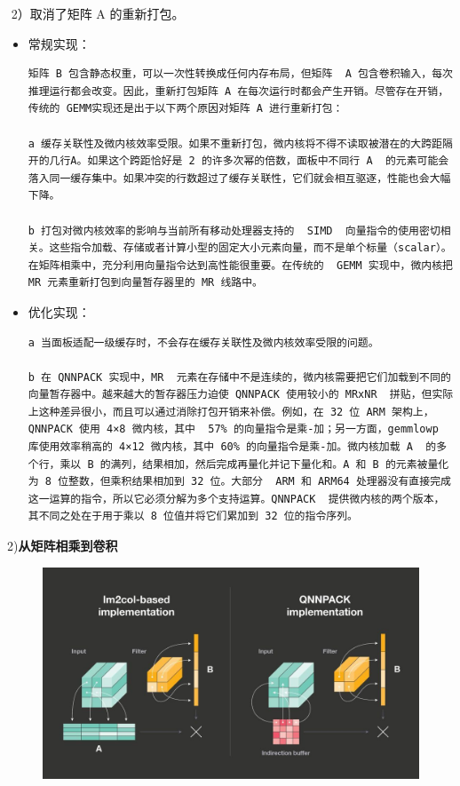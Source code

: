 ​ 2）取消了矩阵 A 的重新打包。

\begin{itemize}
\item
  常规实现：

\begin{verbatim}
矩阵 B 包含静态权重，可以一次性转换成任何内存布局，但矩阵  A 包含卷积输入，每次推理运行都会改变。因此，重新打包矩阵 A 在每次运行时都会产生开销。尽管存在开销，传统的 GEMM实现还是出于以下两个原因对矩阵 A 进行重新打包：

a 缓存关联性及微内核效率受限。如果不重新打包，微内核将不得不读取被潜在的大跨距隔开的几行A。如果这个跨距恰好是 2 的许多次幂的倍数，面板中不同行 A  的元素可能会落入同一缓存集中。如果冲突的行数超过了缓存关联性，它们就会相互驱逐，性能也会大幅下降。

b 打包对微内核效率的影响与当前所有移动处理器支持的  SIMD  向量指令的使用密切相关。这些指令加载、存储或者计算小型的固定大小元素向量，而不是单个标量（scalar）。在矩阵相乘中，充分利用向量指令达到高性能很重要。在传统的  GEMM 实现中，微内核把 MR 元素重新打包到向量暂存器里的 MR 线路中。
\end{verbatim}
\item
  优化实现：

\begin{verbatim}
a 当面板适配一级缓存时，不会存在缓存关联性及微内核效率受限的问题。

b 在 QNNPACK 实现中，MR  元素在存储中不是连续的，微内核需要把它们加载到不同的向量暂存器中。越来越大的暂存器压力迫使 QNNPACK 使用较小的 MRxNR  拼贴，但实际上这种差异很小，而且可以通过消除打包开销来补偿。例如，在 32 位 ARM 架构上，QNNPACK 使用 4×8 微内核，其中  57% 的向量指令是乘-加；另一方面，gemmlowp 库使用效率稍高的 4×12 微内核，其中 60% 的向量指令是乘-加。微内核加载 A  的多个行，乘以 B 的满列，结果相加，然后完成再量化并记下量化和。A 和 B 的元素被量化为 8 位整数，但乘积结果相加到 32 位。大部分  ARM 和 ARM64 处理器没有直接完成这一运算的指令，所以它必须分解为多个支持运算。QNNPACK  提供微内核的两个版本，其不同之处在于用于乘以 8 位值并将它们累加到 32 位的指令序列。
\end{verbatim}
\end{itemize}

2)\textbf{从矩阵相乘到卷积}

\begin{figure}
\centering
\includegraphics{./img/ch17/QNNPACK3.jpeg}
\caption{}
\end{figure}


